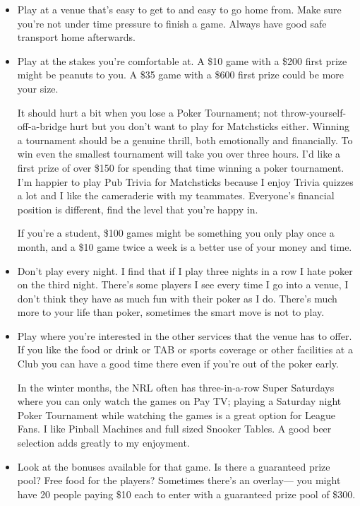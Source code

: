 \begin{itemize}

\item Play at a venue that's easy to get to and easy to go home
from. Make sure you're not under time pressure to finish a game.
Always have good safe transport home afterwards.

\item Play at the stakes you're comfortable at. A \$10
game with a \$200 first prize might be peanuts to you.
A \$35 game with a \$600 first prize could be more your size.

It should hurt a bit when you lose a Poker Tournament; not
throw-yourself-off-a-bridge hurt but you don't want to play for
Matchsticks either. Winning a tournament should be a genuine thrill,
both emotionally and financially. To win even the smallest tournament
will take you over three hours. I'd like a first prize of over \$150 for
spending that time winning a poker tournament. I'm happier to play Pub
Trivia for Matchsticks because I enjoy Trivia quizzes a lot and I like
the cameraderie with my teammates. Everyone's financial
position is different, find the level that you're happy in.

If you're a student, \$100 games might be something
you only play once a month, and a \$10 game twice a week is
a better use of your money and time.

\item Don't play every night. I find that if I play
three nights in a row I hate poker on the third
night. There's some players I see every time I go into a venue,
I don't think they have as much fun with their poker as I do.
There's much more to your life than poker, sometimes the smart
move is not to play.

\item Play where you're interested in the other services
that the venue has to offer. If you like the food or drink or
TAB or sports coverage or other facilities at a Club you can
have a good time there even if you're out of the poker early.

In the winter months, the NRL often has three-in-a-row Super Saturdays
where you can only watch the games on Pay TV; playing a Saturday night
Poker Tournament while watching the games is a great option
for League Fans. I like Pinball Machines and full
sized Snooker Tables. A good beer selection adds greatly to my
enjoyment.

\item Look at the bonuses available for that game. Is there a
guaranteed prize pool? Free food for the players? Sometimes
there's an overlay--- you might have 20 people paying \$10 each
to enter with a guaranteed prize pool of \$300.


\end{itemize}
